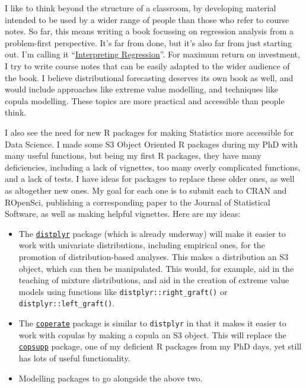 \documentclass[]{article}
\providecommand{\tightlist}{%
  \setlength{\itemsep}{0pt}\setlength{\parskip}{0pt}}
\begin{document}
I like to think beyond the structure of a classroom, by developing material intended to be used by a wider range of people than those who refer to course notes. So far, this means writing a book focussing on regression analysis from a problem-first perspective. It's far from done, but it's also far from just starting out. I'm calling it ``\href{https://interpreting-regression.netlify.com/}{Interpreting Regression}''. For maximum return on investment, I try to write course notes that can be easily adapted to the wider audience of the book. I believe distributional forecasting deserves its own book as well, and would include approaches like extreme value modelling, and techniques like copula modelling. These topics are more practical and accessible than people think.

I also see the need for new R packages for making Statistics more accessible for Data Science. I made some S3 Object Oriented R packages during my PhD with many useful functions, but being my first R packages, they have many deficiencies, including a lack of vignettes, too many overly complicated functions, and a lack of tests. I have ideas for packages to replace these older ones, as well as altogether new ones. My goal for each one is to submit each to CRAN and ROpenSci, publishing a corresponding paper to the Journal of Statistical Software, as well as making helpful vignettes. Here are my ideas:

\begin{itemize}
\tightlist
\item
  The \href{https://github.com/vincenzocoia/distplyr/}{\texttt{distplyr}} package (which is already underway) will make it easier to work with univariate distributions, including empirical ones, for the promotion of distribution-based analyses. This makes a distribution an S3 object, which can then be manipulated. This would, for example, aid in the teaching of mixture distributions, and aid in the creation of extreme value models using functions like \texttt{distplyr::right\_graft()} or \texttt{distplyr::left\_graft()}.
\item
  The \href{https://github.com/vincenzocoia/coperate/}{\texttt{coperate}} package is similar to \texttt{distplyr} in that it makes it easier to work with copulas by making a copula an S3 object. This will replace the \href{https://github.com/vincenzocoia/copsupp/}{\texttt{copsupp}} package, one of my deficient R packages from my PhD days, yet still has lots of useful functionality.
\item
  Modelling packages to go alongside the above two.
\end{itemize}
\end{document}
